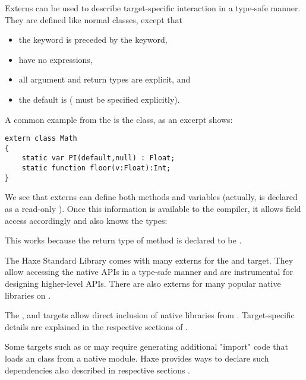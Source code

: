 Externs can be used to describe target-specific interaction in a type-safe manner. They are defined like normal classes, except that

\begin{itemize}
	\item the  keyword is preceded by the  keyword,
	\item {} have no expressions,
	\item all argument and return types are explicit, and
	\item the default  is  ( must be specified explicitly).
\end{itemize}

A common example from the  is the  class, as an excerpt shows:

\begin{lstlisting}
extern class Math
{
	static var PI(default,null) : Float;
	static function floor(v:Float):Int;
}
\end{lstlisting}

We see that externs can define both methods and variables (actually,  is declared as a read-only ). Once this information is available to the compiler, it allows field access accordingly and also knows the types:


This works because the return type of method  is declared to be .

The Haxe Standard Library comes with many externs for the  and  target. They allow accessing the native APIs in a type-safe manner and are instrumental for designing higher-level APIs. There are also externs for many popular native libraries on .

The ,  and  targets allow direct inclusion of native libraries from . Target-specific details are explained in the respective sections of .

Some targets such as  or  may require generating additional "import" code that loads an  class from a native module. Haxe provides ways to declare such dependencies also described in respective sections .

